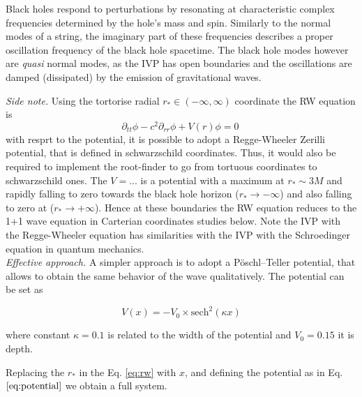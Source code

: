 \documentclass[11pt,a4paper,headinclude=true,DIV=14,BCOR=8mm,chapterprefix,listof=totoc,twoside,openright,abstracton]{scrbook}
\begin{document}
\begin{enumerate}
Black holes respond to perturbations by resonating at characteristic complex frequencies determined by the hole's mass and spin.
Similarly to the normal modes of a string, the imaginary part of these frequencies describes a proper oscillation frequency of the black hole spacetime.
The black hole modes however are {\textit{quasi}} normal modes, as the IVP
has open boundaries and the oscillations are damped (dissipated) by
the emission of gravitational waves. 

\textit{Side note.} Using the tortorise radial $r_*\in(-\infty,\infty)$ coordinate the RW equation is 
  \begin{equation}\label{eq:rw}
    \partial_{tt} \phi - c^2 \partial_{rr} \phi + V(r) \phi = 0  \
  \end{equation}
with resprt to the potential, it is possible to adopt a Regge-Wheeler Zerilli potential, that is defined in schwarzschild coordinates. Thus, it would also be required to implement the root-finder to go from tortuous coordinates to schwarzschild ones. The $V=...$ is a potential with a maximum at $r_*\sim 3M$ and rapidly falling to zero towards the black hole horizon ($r_*\to-\infty$) and also falling to zero at ($r_*\to+\infty$). Hence at these boundaries the RW equation reduces
to the 1+1 wave equation in Carterian coordinates studies below.
Note the IVP with the Regge-Wheeler equation has similarities with the IVP with the Schroedinger equation in quantum mechanics. \\

\textit{Effective approach.} A simpler approach is to adopt a Pöschl–Teller potential, that allows to obtain the same behavior of the wave qualitatively. The potential can be set as


\begin{equation}
\label{eq:potential}
V(x) = -V_0 \times \text{sech}^2(\kappa x)
\end{equation}

where constant $\kappa = 0.1$ is related to the width of the potential and $V_0=0.15$ it is depth. 

Replacing the $r_*$ in the Eq. \ref{eq:rw} with $x$, and defining the potential as in Eq. $\ref{eq:potential}$ we obtain a full system. \\


\end{enumerate}
\end{document}
